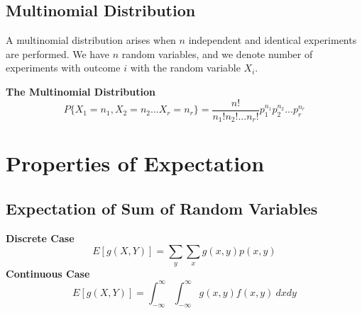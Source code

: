 \documentclass[10pt,a4paper]{article}
\begin{document}
    \subsection{Multinomial Distribution}
    A multinomial distribution arises when $n$ independent and identical experiments are performed. We have $n$ random variables, and we denote number of experiments with outcome $i$ with the random variable $X_{i}$.
    \begin{framed}
    	\centering\textbf{The Multinomial Distribution}
    	$$P\{X_{1}=n_{1}, X_{2}=n_{2}...X_{r}=n_{r}\} = \frac{n!}{n_{1}!n_{2}!...n_{r}!}p_{1}^{n_{1}}p_{2}^{n_{2}}...p_{r}^{n_{r}} $$
    \end{framed}
    \section{Properties of Expectation}
    \subsection{Expectation of Sum of Random Variables}
    \begin{framed}
    	\centering\textbf{Discrete Case}
    	    $$E[g(X,Y)] = \sum_{y}\sum_{x}g(x,y)p(x,y)$$
    	\centering\textbf{Continuous Case}
    	    $$E[g(X,Y)] = \int_{-\infty}^{\infty}\int_{-\infty}^{\infty}g(x,y)f(x,y)\ dxdy$$
    \end{framed}
    \newpage 
\end{document}
